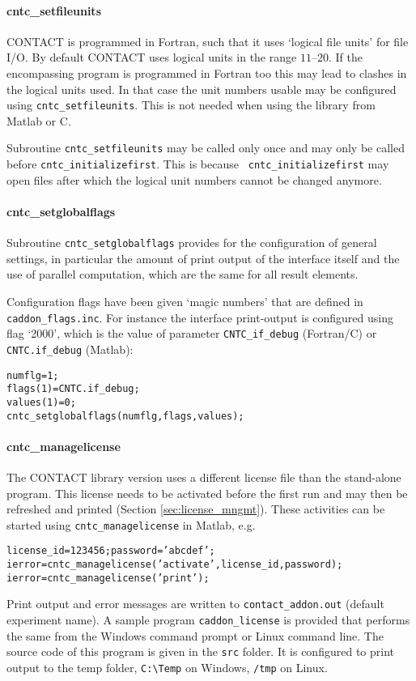 \documentclass[12pt]{report}
\begin{document}
\paragraph{cntc\_setfileunits}

CONTACT is programmed in Fortran, such that it uses `logical file units'
for file I/O. By default CONTACT uses logical units in the range
$11\text{--}20$. If the encompassing program is programmed in Fortran too
this may lead to clashes in the logical units used. In that case the unit
numbers usable may be configured using {\tt cntc\_setfileunits}. This is
not needed when using the library from Matlab or C.

Subroutine {\tt cntc\_setfileunits} may be called only once and may only be
called before {\tt cntc\_\-init\-ia\-lize\-first}. This is because {\tt
cntc\_initializefirst} may open files after which the logical unit numbers
cannot be changed anymore.

\paragraph{cntc\_setglobalflags}

Subroutine {\tt cntc\_setglobalflags} provides for the configuration of
general settings, in particular the amount of print output of the
interface itself and the use of parallel computation, which are the same
for all result elements.

Configuration flags have been given `magic numbers' that are defined in {\tt 
caddon\_flags.inc}. For instance the interface
print-output is configured using flag `2000', which is the value of
parameter {\tt CNTC\_if\_debug} (Fortran/C) or {\tt CNTC.if\_debug} (Matlab):
\begin{alltt}\small
    numflg    = 1;             % configure idebug = 0 in the CONTACT library
    flags(1)  = CNTC.if_debug;
    values(1) = 0;
    cntc_setglobalflags(numflg, flags, values);
\end{alltt}

\paragraph{cntc\_managelicense}

The CONTACT library version uses a different license file than the
stand-alone program. This license needs to be activated before the first
run and may then be refreshed and printed (Section \ref{sec:license_mngmt}).
These activities can be started using {\tt cntc\_manage\-li\-cense} in Matlab,
e.g.\
\begin{alltt}\small
    license_id = 123456; password = 'abcdef';
    ierror = cntc_managelicense('activate', license_id, password);
    ierror = cntc_managelicense('print');
\end{alltt}
Print output and error messages are written to {\tt contact\_addon.out}
(default experiment name). A sample program {\tt caddon\_license} is
provided that performs the same from the Windows command prompt or Linux
command line. The source code of this program is given in the {\tt src}
folder. It is configured to print output to the temp folder, \verb+C:\Temp+
on Windows, \verb+/tmp+ on Linux.
\end{document}
